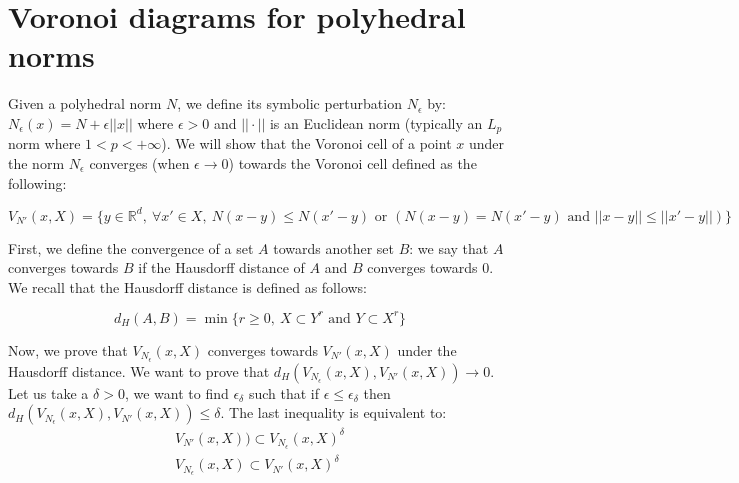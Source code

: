 \chapter{Voronoi diagrams for polyhedral norms}
\label{appendix:voronoi-polyhedral-norm}

Given a polyhedral norm $ N $, we define its symbolic perturbation $ N_\epsilon
$ by: $ N_\epsilon (x) = N + \epsilon || x || $ where $ \epsilon > 0 $ and  $ ||
\cdot || $ is an Euclidean norm (typically an $ L_p $ norm where $ 1 < p <
+\infty $).  We will show that the Voronoi cell of a point $ x $ under the norm
$ N_\epsilon $ converges (when $ \epsilon \rightarrow 0 $) towards the Voronoi
cell defined as the following:

$$ V_{N'}(x, X) = \{ y \in \mathbb{R}^d,~\forall x' \in X,~N(x - y) \leq N(x'
-y) \text{ or } (N(x - y) = N(x' - y) \text { and } || x -y || \leq || x' - y ||) \} $$

First, we define the convergence of a set $ A $ towards another set $ B $: we
say that $ A $ converges towards $ B $ if the Hausdorff distance of $ A $ and $
B $ converges towards $ 0 $. We recall that the Hausdorff distance is defined as
follows:

$$ d_H(A, B) = \min \{ r \geq 0,~X \subset Y^r \text{ and } Y \subset X^r \} $$

Now, we prove that $ V_{N_\epsilon}(x, X) $ converges towards $ V_{N'}(x, X) $
under the Hausdorff distance. We want to prove that $ d_H(V_{N_\epsilon}(x, X),
V_{N'}(x, X)) \to 0 $.  Let us take a $ \delta > 0 $, we want to find $
\epsilon_\delta $ such that if $ \epsilon \leq \epsilon_\delta $ then $
d_H(V_{N_\epsilon}(x, X), V_{N'}(x, X)) \leq \delta $. The last inequality is
equivalent to:
\begin{align}
    V_{N'}(x, X)) \subset V_{N_\epsilon}(x, X)^\delta \\
    V_{N_\epsilon}(x, X) \subset V_{N'}(x, X)^\delta
    \label{eqn:haussdorf-voronoi1}
\end{align}

